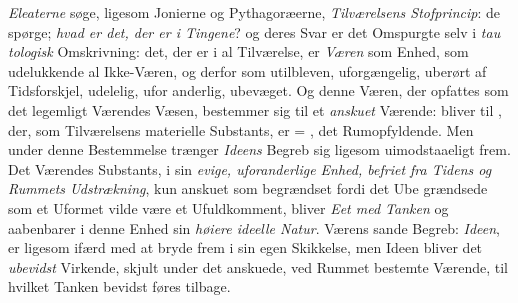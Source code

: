 \emph{Eleaterne} søge, ligesom Jonierne og Pythagoræerne,
\emph{Tilværelsens Stofprincip}: de spørge; \emph{hvad er det, der
er i Tingene}? og deres Svar er det Omspurgte selv i \emph{tau\-%
tologisk} Omskrivning: det, der er i al Tilværelse, er \emph{Væren}
som Enhed, som udelukkende al Ikke-Væren, og derfor som
utilbleven, uforgængelig, uberørt af Tidsforskjel, udelelig, ufor\-%
anderlig, ubevæget. Og denne Væren, der opfattes som det
legemligt Værendes Væsen, bestemmer sig til et \emph{anskuet}
Værende:  bliver til , der, som Tilværelsens
materielle Substants, er = , det Rumopfyldende. Men
under denne Bestemmelse trænger \emph{Ideens} Begreb sig ligesom
uimodstaaeligt frem. Det Værendes Substants, i sin \emph{evige,
uforanderlige Enhed, befriet fra Tidens og Rummets
Udstrækning}, kun anskuet som begrændset fordi det Ube\-%
grændsede som et Uformet vilde være et Ufuldkomment, bliver
\emph{Eet med Tanken} og aabenbarer i denne Enhed sin \emph{høiere
ideelle Natur}. Værens sande Begreb: \emph{Ideen}, er ligesom
ifærd med at bryde frem i sin egen Skikkelse, men Ideen
bliver det \emph{ubevidst} Virkende, skjult under det anskuede, ved
Rummet bestemte Værende, til hvilket Tanken bevidst føres
tilbage.

